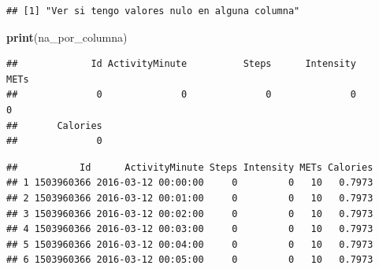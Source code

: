 \documentclass[
]{article}
\newenvironment{Shaded}{\begin{snugshade}}{\end{snugshade}}
\newcommand{\AttributeTok}[1]{\textcolor[rgb]{0.13,0.29,0.53}{#1}}
\newcommand{\CommentTok}[1]{\textcolor[rgb]{0.56,0.35,0.01}{\textit{#1}}}
\newcommand{\FunctionTok}[1]{\textcolor[rgb]{0.13,0.29,0.53}{\textbf{#1}}}
\newcommand{\NormalTok}[1]{#1}
\newcommand{\OtherTok}[1]{\textcolor[rgb]{0.56,0.35,0.01}{#1}}
\newcommand{\SpecialCharTok}[1]{\textcolor[rgb]{0.81,0.36,0.00}{\textbf{#1}}}
\newcommand{\StringTok}[1]{\textcolor[rgb]{0.31,0.60,0.02}{#1}}
\begin{document}
\begin{verbatim}
## [1] "Ver si tengo valores nulo en alguna columna"
\end{verbatim}

\begin{Shaded}
\begin{Highlighting}[]
\FunctionTok{print}\NormalTok{(na\_por\_columna)}
\end{Highlighting}
\end{Shaded}

\begin{verbatim}
##             Id ActivityMinute          Steps      Intensity           METs 
##              0              0              0              0              0 
##       Calories 
##              0
\end{verbatim}

\begin{Shaded}
\end{Shaded}

\begin{verbatim}
##           Id      ActivityMinute Steps Intensity METs Calories
## 1 1503960366 2016-03-12 00:00:00     0         0   10   0.7973
## 2 1503960366 2016-03-12 00:01:00     0         0   10   0.7973
## 3 1503960366 2016-03-12 00:02:00     0         0   10   0.7973
## 4 1503960366 2016-03-12 00:03:00     0         0   10   0.7973
## 5 1503960366 2016-03-12 00:04:00     0         0   10   0.7973
## 6 1503960366 2016-03-12 00:05:00     0         0   10   0.7973
\end{verbatim}

\begin{Shaded}
\end{Shaded}
\end{document}
